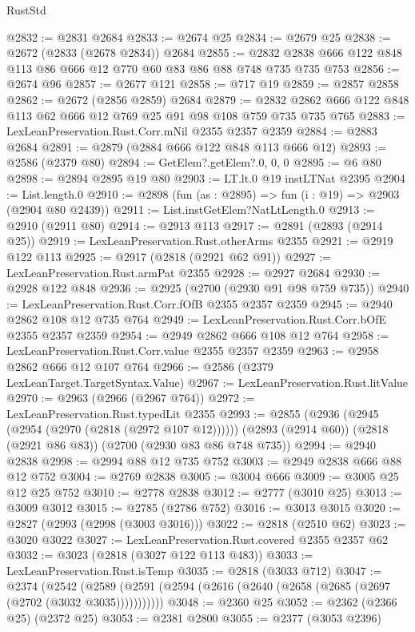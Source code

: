 \begin{lexlean}{RustStd}
\begin{coremodule}
@2832 := @2831 @2684
@2833 := @2674 @25
@2834 := @2679 @25
@2838 := @2672 (@2833 (@2678 @2834)) @2684
@2855 := @2832 @2838 @666 @122 @848 @113 @86 @666 @12 @770 @60 @83 @86 @88 @748 @735 @735 @753
@2856 := @2674 @96
@2857 := @2677 @121
@2858 := @717 @19
@2859 := @2857 @2858
@2862 := @2672 (@2856 @2859) @2684
@2879 := @2832 @2862 @666 @122 @848 @113 @62 @666 @12 @769 @25 @91 @98 @108 @759 @735 @735 @765
@2883 := LexLeanPreservation.Rust.Corr.mNil @2355 @2357 @2359
@2884 := @2883 @2684
@2891 := @2879 (@2884 @666 @122 @848 @113 @666 @12)
@2893 := @2586 (@2379 @80)
@2894 := GetElem?.getElem?.{0, 0, 0}
@2895 := @6 @80
@2898 := @2894 @2895 @19 @80
@2903 := LT.lt.{0} @19 instLTNat @2395
@2904 := List.length.{0}
@2910 := @2898 (fun (as : @2895) => fun (i : @19) => @2903 (@2904 @80 @2439))
@2911 := List.instGetElem?NatLtLength.{0}
@2913 := @2910 (@2911 @80)
@2914 := @2913 @113
@2917 := @2891 (@2893 (@2914 @25))
@2919 := LexLeanPreservation.Rust.otherArms @2355
@2921 := @2919 @122 @113
@2925 := @2917 (@2818 (@2921 @62 @91))
@2927 := LexLeanPreservation.Rust.armPat @2355
@2928 := @2927 @2684
@2930 := @2928 @122 @848
@2936 := @2925 (@2700 (@2930 @91 @98 @759 @735))
@2940 := LexLeanPreservation.Rust.Corr.fOfB @2355 @2357 @2359
@2945 := @2940 @2862 @108 @12 @735 @764
@2949 := LexLeanPreservation.Rust.Corr.bOfE @2355 @2357 @2359
@2954 := @2949 @2862 @666 @108 @12 @764
@2958 := LexLeanPreservation.Rust.Corr.value @2355 @2357 @2359
@2963 := @2958 @2862 @666 @12 @107 @764
@2966 := @2586 (@2379 LexLeanTarget.TargetSyntax.Value)
@2967 := LexLeanPreservation.Rust.litValue
@2970 := @2963 (@2966 (@2967 @764))
@2972 := LexLeanPreservation.Rust.typedLit @2355
@2993 := @2855
    (@2936 (@2945 (@2954 (@2970 (@2818 (@2972 @107 @12))))))
    (@2893 (@2914 @60))
    (@2818 (@2921 @86 @83))
    (@2700 (@2930 @83 @86 @748 @735))
@2994 := @2940 @2838
@2998 := @2994 @88 @12 @735 @752
@3003 := @2949 @2838 @666 @88 @12 @752
@3004 := @2769 @2838
@3005 := @3004 @666
@3009 := @3005 @25 @12 @25 @752
@3010 := @2778 @2838
@3012 := @2777 (@3010 @25)
@3013 := @3009 @3012
@3015 := @2785 (@2786 @752)
@3016 := @3013 @3015
@3020 := @2827 (@2993 (@2998 (@3003 @3016)))
@3022 := @2818 (@2510 @62)
@3023 := @3020 @3022
@3027 := LexLeanPreservation.Rust.covered @2355 @2357 @62
@3032 := @3023 (@2818 (@3027 @122 @113 @483))
@3033 := LexLeanPreservation.Rust.isTemp
@3035 := @2818 (@3033 @712)
@3047 := @2374
    (@2542 (@2589 (@2591 (@2594 (@2616 (@2640 (@2658 (@2685 (@2697 (@2702 (@3032 @3035)))))))))))
@3048 := @2360 @25
@3052 := @2362 (@2366 @25) (@2372 @25)
@3053 := @2381 @2800
@3055 := @2377 (@3053 @2396)

\end{coremodule}
\end{lexlean}
